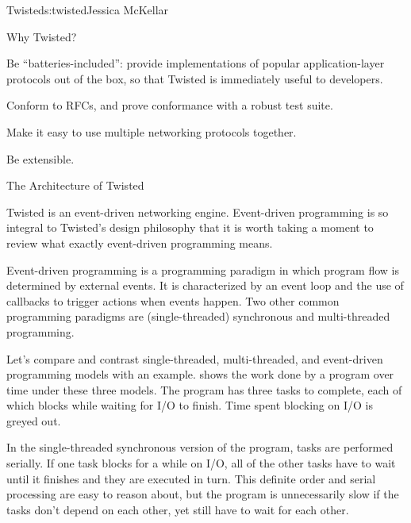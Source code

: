 \begin{aosachapter}{Twisted}{s:twisted}{Jessica McKellar}
\begin{aosasect1}{Why Twisted?}
\begin{aosaitemize}
\item Be ``batteries-included'': provide implementations of popular
  application-layer protocols out of the box, so that Twisted is
  immediately useful to developers.

\item Conform to RFCs, and prove conformance with a robust test suite.

\item Make it easy to use multiple networking protocols together.

\item Be extensible.

\end{aosaitemize}

\end{aosasect1}

\begin{aosasect1}{The Architecture of Twisted}

Twisted is an event-driven networking engine. Event-driven programming is so
integral to Twisted's design philosophy that it is worth taking a moment to
review what exactly event-driven programming means.

Event-driven programming is a programming paradigm in which program flow is
determined by external events. It is characterized by an event loop and the use
of callbacks to trigger actions when events happen. Two other common
programming paradigms are (single-threaded) synchronous and multi-threaded
programming.


Let's compare and contrast single-threaded, multi-threaded, and
event-driven programming models with an example.
 shows the work done by a
program over time under these three models. The program has three tasks to
complete, each of which blocks while waiting for I/O to finish. Time
spent blocking on I/O is greyed out.

In the single-threaded synchronous version of the program, tasks are
performed serially. If one task blocks for a while on I/O, all of the other
tasks have to wait until it finishes and they are executed in turn. This
definite order and serial processing are easy to reason about, but the program
is unnecessarily slow if the tasks don't depend on each other, yet still have to
wait for each other.


\end{aosasect1}
\end{aosachapter}

